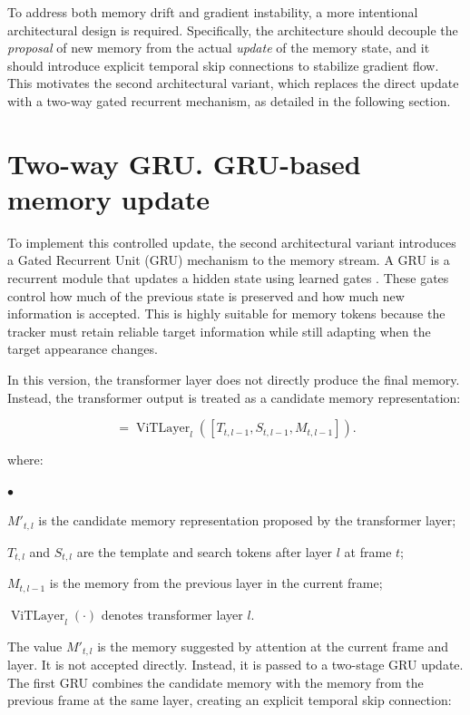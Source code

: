 \documentclass[bachelorthesis]{fer}
\numberwithin{equation}{chapter}
\newcommand{\FormulaNotationWith}[2]{%
    \vspace{-0.6em}
    \noindent\hspace*{1.2em}%
    \begin{minipage}{0.90\textwidth}
        \footnotesize
        #1
        \vspace{0.2em}
        \begin{list}{\(\bullet\)}{
            \setlength{\leftmargin}{1.4em}
            \setlength{\labelwidth}{0.8em}
            \setlength{\labelsep}{0.5em}
            \setlength{\itemsep}{0.05em}
            \setlength{\parsep}{0pt}
            \setlength{\topsep}{0.25em}
            \setlength{\partopsep}{0pt}
        }
            #2
        \end{list}
    \end{minipage}
    \par
    \vspace{0.8em}

}
\newcommand{\FormulaNotation}[1]{\FormulaNotationWith{where:}{#1}}
\begin{document}
    To address both memory drift and gradient instability, a more intentional architectural design is required.
    Specifically, the architecture should decouple the \emph{proposal} of new memory from the actual \emph{update} of the memory state,
    and it should introduce explicit temporal skip connections to stabilize gradient flow. This motivates the second
    architectural variant, which replaces the direct update with a two-way gated recurrent mechanism, as detailed in the
    following section.


    \section{Two-way GRU. GRU-based memory update}\label{variant-b-gru-based-memory-update-and-two-stage-architecture}

    To implement this controlled update, the second architectural variant introduces a Gated Recurrent Unit (GRU) mechanism
    to the memory stream. A GRU is a recurrent module that updates a hidden state using learned gates \cite{cho2014gru}. These gates
    control how much of the previous state is preserved and how much new information is accepted. This is highly suitable
    for memory tokens because the tracker must retain reliable target information while still adapting when the target
    appearance changes.

    In this version, the transformer layer does not directly produce the final memory. Instead, the transformer output is
    treated as a candidate memory representation:

    \begin{equation}
    [T_{t,l}, S_{t,l}, M'_{t,l}]
        =
        \operatorname{ViTLayer}_l([T_{t,l-1}, S_{t,l-1}, M_{t,l-1}]).
    \end{equation}
    \FormulaNotation{
        \item \(M'_{t,l}\) is the candidate memory representation proposed by the transformer layer;
        \item \(T_{t,l}\) and \(S_{t,l}\) are the template and search tokens after layer \(l\) at frame \(t\);
        \item \(M_{t,l-1}\) is the memory from the previous layer in the current frame;
        \item \(\operatorname{ViTLayer}_l(\cdot)\) denotes transformer layer \(l\).
    }

    The value \(M'_{t,l}\) is the memory suggested by attention at the current frame and layer. It is not accepted directly.
    Instead, it is passed to a two-stage GRU update. The first GRU combines the candidate memory with the memory from the
    previous frame at the same layer, creating an explicit temporal skip connection:
\end{document}

